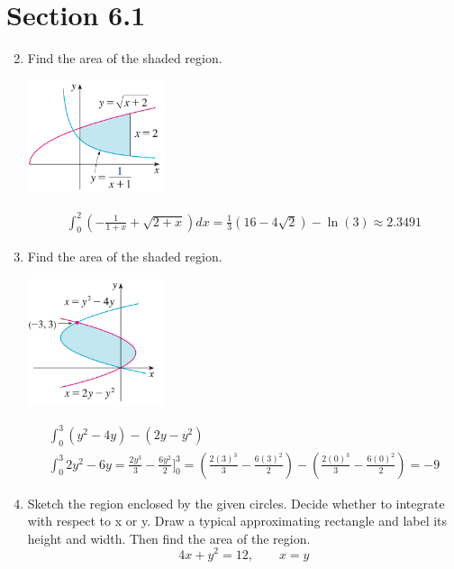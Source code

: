 \documentclass{article}
\begin{document}
\section{Section 6.1}
\begin{enumerate}
\setcounter{enumi}{1}
	\item Find the area of the shaded region.
	\begin{center}
		\includegraphics[width=4cm]{images/61pr2}
	\end{center}
	$$\begin{align}
		\int_{0}^{2}\left(-\frac{1}{1+x}+\sqrt{2+x}\right)dx = \frac{1}{3}\left(16-4\sqrt{2}\right)-\ln(3)\approx 2.3491
	\end{align}$$
\setcounter{enumi}{3}
	\item Find the area of the shaded region.
	\begin{center}
		\includegraphics[width=4cm]{images/61pr4}
	\end{center}
	$$\begin{align}
		\int_{0}^{3}\left(y^2-4y\right)-\left(2y-y^2\right)\\
		\int_{0}^{3}2y^2-6y = \frac{2y^3}{3}-\frac{6y^2}{2}\Bigg]^3_0 = \left(\frac{2(3)^3}{3}-\frac{6(3)^2}{2}\right)-\left(\frac{2(0)^3}{3}-\frac{6(0)^2}{2}\right)=\boxed{-9}
	\end{align}$$
\setcounter{enumi}{9}
	\item Sketch the region enclosed by the given circles. Decide whether to integrate with respect to x or y. Draw a typical approximating rectangle and label its height and width. Then find the area of the region. $$4x+y^2=12,\qquad x=y$$
	\begin{center}
		\pgfplotsset{width=12cm,height=8cm,ymin=-7,xmin=-7,xmax=4}
	\end{center}
\end{enumerate}
\end{document}
